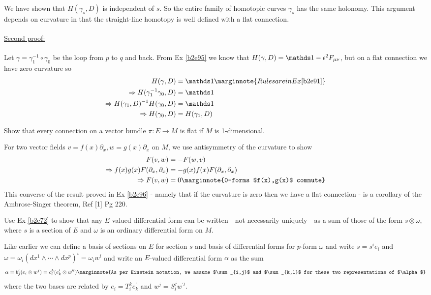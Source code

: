 \documentclass[10pt]{article}
\begin{document}
We have shown that $H(\gamma_s,D)$ is independent of $s$. So the entire family of homotopic curves $\gamma_s$ has the same holonomy. This argument depends on curvature in that the straight-line homotopy is well defined with a flat connection.\\\\
\underline{Second proof:}\\\\
Let $\gamma = \gamma_1^{-1} \circ \gamma_0$ be the loop from $p$ to $q$ and back. From Ex \ref{b2e95} we know that $H(\gamma,D)=\id-\epsilon^2F_{\mu\nu}$, but on a flat connection we have zero curvature so
$$
\begin{aligned}
	H(\gamma,D) &= \id\marginnote{Rules are in Ex \ref{b2e91}}\\
	\Rightarrow H(\gamma_1^{-1}\gamma_0,D) &= \id\\
	\Rightarrow H(\gamma_1,D)^{-1}H(\gamma_0,D) &= \id\\
	\Rightarrow H(\gamma_0,D) &= H(\gamma_1,D)
\end{aligned}
$$


\begin{example}
	Show that every connection on a vector bundle $\pi:E\to M$ is flat if $M$ is 1-dimensional.
\end{example}
\sol For two vector fields $v=f(x)\partial_x,w=g(x)\partial_x$ on $M$, we use antisymmetry of the curvature to show
$$
\begin{aligned}
	F(v,w) &= -F(w,v)\\
	\Rightarrow f(x)g(x)F(\partial_x,\partial_x) &= -g(x)f(x)F(\partial_x,\partial_x)\\
	\Rightarrow F(v,w) &= 0\marginnote{0-forms $f(x),g(x)$ commute}
\end{aligned}
$$
This converse of the result proved in Ex \ref{b2e96} - namely that if the curvature is zero then we have a flat connection - is a corollary of the Ambrose-Singer theorem, Ref [1] Pg 220.


\begin{example}\label{b2e98}
	Use Ex \ref{b2e72} to show that any $E$-valued differential form can be written - not necessarily uniquely - as a sum of those of the form $s\otimes \omega$, where $s$ is a section of $E$ and $\omega$ is an ordinary differential form on $M$.
\end{example}
\sol Like earlier we can define a basis of sections on $E$ for section $s$ and basis of differential forms for $p$-form $\omega$ and write $s=s^ie_i$ and $\omega=\omega_i (dx^1\wedge\cdots\wedge dx^p)^i = \omega_i w^i$ and write an $E$-valued differential form $\alpha$ as the sum
$$
\alpha = b_j^i (e_i \otimes w^j) = c_l^k (e_k^\prime \otimes w^{\prime l}) \marginnote{As per Einstein notation, we assume $\sum_{i,j}$ and $\sum_{k,l}$ for these two representations of $\alpha$}
$$
where the two bases are related by $e_i = T_i^k e_k^\prime$ and $w^j = S_l^j w^{\prime l}$.
\end{document}
